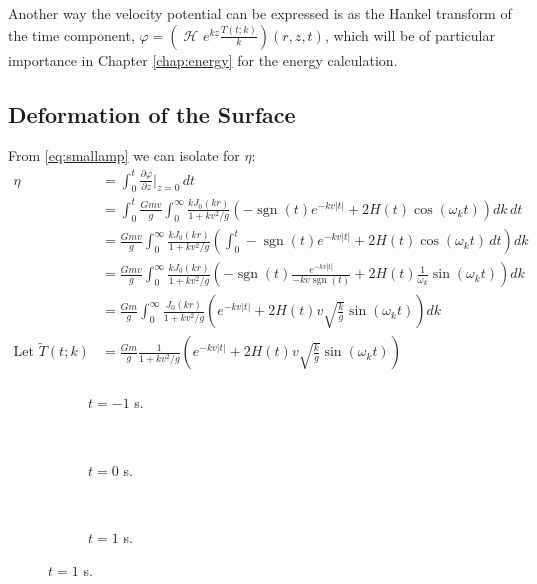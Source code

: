 \documentclass[12pt]{article}
\DeclareMathOperator{\sgn}{sgn}
\DeclareMathOperator{\Hsign}{\mathscr{H}}
\newcommand\Hank[2][]{{\left( \Hsign_{#1} #2 \right) }}
\begin{document}
Another way the velocity potential can be expressed is as the Hankel transform of the time component, $\varphi = \Hank{e^{kz}\frac{T(t;k)}{k}}(r,z,t)$, which will be of particular importance in Chapter \ref{chap:energy} for the energy calculation.

\subsection{Deformation of the Surface}

From \eqref{eq:smallamp} we can isolate for $\eta$:
\begin{align*}
\eta &= \int_0^t \frac{\partial \varphi}{\partial z} \bigg|_{z=0} \, dt \\
&= \int_0^t \frac{Gmv}{g} \int_0^\infty \frac{k J_0(kr)}{1+kv^2/g} \left(-\sgn(t)e^{-kv|t|} + 2H(t)\cos(\omega_k t) \right) dk \, dt \\
&= \frac{Gmv}{g} \int_0^\infty \frac{k J_0(kr)}{1+kv^2/g} \left( \int_0^t  -\sgn(t)e^{-kv|t|} + 2H(t)\cos(\omega_k t) \, dt \right) dk \\
&= \frac{Gmv}{g} \int_0^\infty \frac{k J_0(kr)}{1+kv^2/g} \left( -\sgn(t) \frac{e^{-kv|t|}}{-k v \sgn(t)} + 2H(t)\frac{1}{\omega_k}\sin(\omega_k t) \right) dk \\
&= \frac{Gm}{g} \int_0^\infty \frac{J_0(kr)}{1+kv^2/g} \left( e^{-kv|t|} + 2H(t) v \sqrt{\frac{k}{g}} \sin(\omega_k t) \right) dk \\
\text{Let } \widetilde{T}(t;k) &= \frac{Gm}{g} \frac{1}{1+kv^2/g} \left( e^{-kv|t|} + 2H(t) v \sqrt{\frac{k}{g}} \sin(\omega_k t) \right) \\
\end{align*}






\begin{figure}[p]
\begin{centering}
 \begin{subfigure}{\textwidth}
  
  \caption{$t=-1$ s.}
 \end{subfigure} \\
 \begin{subfigure}{\textwidth}
  
  \caption{$t=0$ s.}
 \end{subfigure} \\
 \begin{subfigure}{\textwidth}
  
  \caption{$t=1$ s.}
 \end{subfigure}
\end{centering}
\end{figure}
\end{document}
